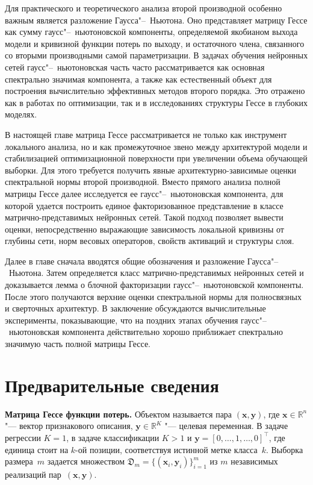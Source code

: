 Для практического и теоретического анализа второй производной особенно важным является разложение Гаусса"--~Ньютона. Оно представляет матрицу Гессе как сумму гаусс"--~ньютоновской компоненты, определяемой якобианом выхода модели и кривизной функции потерь по выходу, и остаточного члена, связанного со вторыми производными самой параметризации. В задачах обучения нейронных сетей гаусс"--~ньютоновская часть часто рассматривается как основная спектрально значимая компонента, а также как естественный объект для построения вычислительно эффективных методов второго порядка. Это отражено как в работах по оптимизации, так и в исследованиях структуры Гессе в глубоких моделях. \cite{pearlmutter1994,martens2010hf,martens2015optimizing,botev2017practical,zhao2024gaussnewton}

В настоящей главе матрица Гессе рассматривается не только как инструмент локального анализа, но и как промежуточное звено между архитектурой модели и стабилизацией оптимизационной поверхности при увеличении объема обучающей выборки. Для этого требуется получить явные архитектурно-зависимые оценки спектральной нормы второй производной. Вместо прямого анализа полной матрицы Гессе далее исследуется ее гаусс"--~ньютоновская компонента, для которой удается построить единое факторизованное представление в классе матрично-представимых нейронных сетей. Такой подход позволяет вывести оценки, непосредственно выражающие зависимость локальной кривизны от глубины сети, норм весовых операторов, свойств активаций и структуры слоя.

Далее в главе сначала вводятся общие обозначения и разложение Гаусса"--~Ньютона. Затем определяется класс матрично-представимых нейронных сетей и доказывается лемма о блочной факторизации гаусс"--~ньютоновской компоненты. После этого получаются верхние оценки спектральной нормы для полносвязных и сверточных архитектур. В заключение обсуждаются вычислительные эксперименты, показывающие, что на поздних этапах обучения гаусс"--~ньютоновская компонента действительно хорошо приближает спектрально значимую часть полной матрицы Гессе. \cite{dauphin2014,sagun2017hessian,ghorbani2019investigation}

\section{Предварительные сведения}

\textbf{Матрица Гессе функции потерь.} Объектом называется пара $(\mathbf{x}, \mathbf{y})$, где $\mathbf{x} \in \mathbb{R}^n$ "--- вектор признакового описания, $\mathbf{y} \in \mathbb{R}^K$ "--- целевая переменная. В задаче регрессии $K = 1$, в задаче классификации $K > 1$ и $\mathbf{y} = [0, \ldots, 1, \ldots, 0]^\top$, где единица стоит на $k$-ой позиции, соответствуя истинной метке класса~$k$. Выборка размера~$m$ задается множеством $\mathfrak{D}_m = \{(\mathbf{x}_i, \mathbf{y}_i)\}_{i=1}^m$ из $m$ независимых реализаций пар~$(\mathbf{x}, \mathbf{y})$. 

